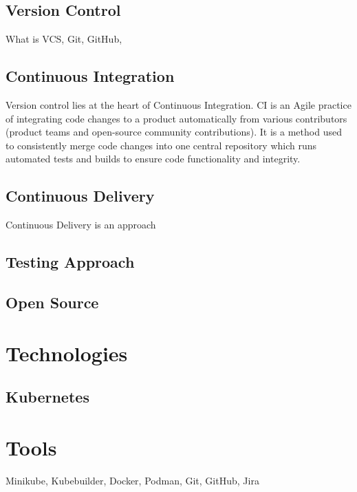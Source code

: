 \documentclass{article}
\begin{document}
\subsection{Version Control}
What is VCS, Git, GitHub, 



\subsection{Continuous Integration}
Version control lies at the heart of Continuous Integration. CI is an Agile practice of integrating code changes to a product automatically from various contributors (product teams and open-source community contributions). It is a method used to consistently merge code changes into one central repository which runs automated tests and builds to ensure code functionality and integrity.   



\subsection{Continuous Delivery}
Continuous Delivery is an approach 



\subsection{Testing Approach}



\subsection{Open Source}



\section{Technologies} \label{technologies} \hypertarget{technologies}{}


\subsection{Kubernetes}



\section{Tools}
Minikube, Kubebuilder, Docker, Podman, Git, GitHub, Jira
\end{document}
